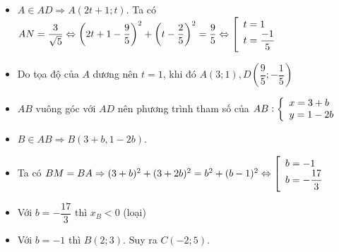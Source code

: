 \begin{itemize}[label=,leftmargin=*]
\item $A\in AD\Rightarrow A(2t+1;t)$. Ta có $AN=\dfrac{3}{\sqrt{5}}\Leftrightarrow \left( 2t+1-\dfrac{9}{5}\right)^2+\left(t-\dfrac{2}{5} \right)^2=\dfrac{9}{5}\Leftrightarrow \left[\begin{array}{ll}t=1\\ t=\dfrac{-1}{5}\end{array}\right.$
\item Do tọa độ của $A$ dương nên $t=1$, khi đó $A(3;1),D\left(\dfrac{9}{5};-\dfrac{1}{5} \right)$
\item $AB$ vuông góc với $AD$ nên phương trình tham số của $AB: \left\{\begin{array}{ll}x=3+b \\ y=1-2b\end{array}\right.$
\item $B\in AB\Rightarrow B(3+b,1-2b)$.
\item Ta có $BM=BA\Rightarrow (3+b)^2+(3+2b)^2=b^2+(b-1)^2\Leftrightarrow \left[\begin{array}{ll}b=-1 \\ b=-\dfrac{17}{3}\end{array}\right.$
\item Với $b=-\dfrac{17}{3}$ thì $x_B<0$ (loại)
\item Với $b=-1$ thì $B(2;3)$. Suy ra $C(-2;5)$.
\end{itemize} 

